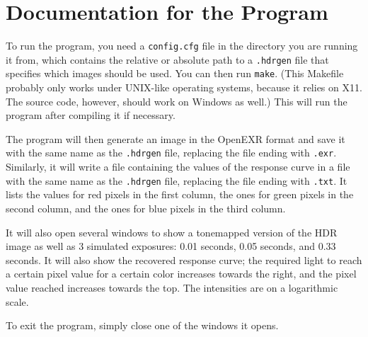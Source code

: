 \section{Documentation for the Program}\label{sec:doc}

To run the program, you need a \texttt{config.cfg} file in the directory you
are running it from, which contains the relative or absolute path to a
\texttt{.hdrgen} file that specifies which images should be used. You can then
run \texttt{make}. (This Makefile probably only works under UNIX-like operating
systems, because it relies on X11. The source code, however, should work on
Windows as well.) This will run the program after compiling it if necessary.

The program will then generate an image in the OpenEXR format and save it with
the same name as the \texttt{.hdrgen} file, replacing the file ending with
\texttt{.exr}.  Similarly, it will write a file containing the values of the
response curve in a file with the same name as the \texttt{.hdrgen} file,
replacing the file ending with \texttt{.txt}. It lists the values for red
pixels in the first column, the ones for green pixels in the second column, and
the ones for blue pixels in the third column.

It will also open several windows to show a tonemapped version of the HDR image
as well as 3 simulated exposures: 0.01 seconds, 0.05 seconds, and 0.33 seconds.
It will also show the recovered response curve; the required light to reach a
certain pixel value for a certain color increases towards the right, and the pixel
value reached increases towards the top. The intensities are on a logarithmic
scale.

To exit the program, simply close one of the windows it opens.
